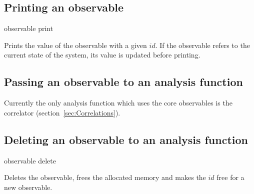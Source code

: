 \subsection{Printing an observable}
\begin{essyntax}
observable  print 
\end{essyntax}
Prints the value of the observable with a given $id$. If the observable
refers to the current state of the system, its value is updated before printing.

\subsection{Passing an observable to an analysis function}
Currently the only analysis function which uses the core observables
is the correlator (section~\ref{sec:Correlations}).

\subsection{Deleting an observable to an analysis function}
\begin{essyntax}
observable  delete
\end{essyntax}
Deletes the observable, \ie frees the allocated memory
and makes the $id$ free for a new observable.



